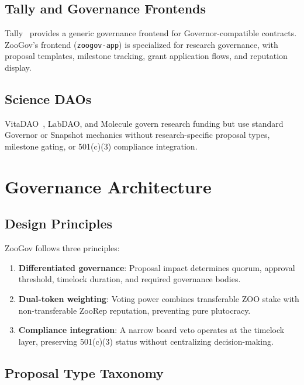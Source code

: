 \documentclass[11pt,letterpaper]{article}
\begin{document}
\subsection{Tally and Governance Frontends}

Tally~\cite{tally2023} provides a generic governance frontend for Governor-compatible contracts. ZooGov's frontend (\texttt{zoogov-app}) is specialized for research governance, with proposal templates, milestone tracking, grant application flows, and reputation display.

\subsection{Science DAOs}

VitaDAO~\cite{vitadao2022}, LabDAO, and Molecule govern research funding but use standard Governor or Snapshot mechanics without research-specific proposal types, milestone gating, or 501(c)(3) compliance integration.

\section{Governance Architecture}
\label{sec:architecture}

\subsection{Design Principles}

ZooGov follows three principles:

\begin{enumerate}
    \item \textbf{Differentiated governance}: Proposal impact determines quorum, approval threshold, timelock duration, and required governance bodies.
    \item \textbf{Dual-token weighting}: Voting power combines transferable ZOO stake with non-transferable ZooRep reputation, preventing pure plutocracy.
    \item \textbf{Compliance integration}: A narrow board veto operates at the timelock layer, preserving 501(c)(3) status without centralizing decision-making.
\end{enumerate}

\subsection{Proposal Type Taxonomy}
\end{document}
